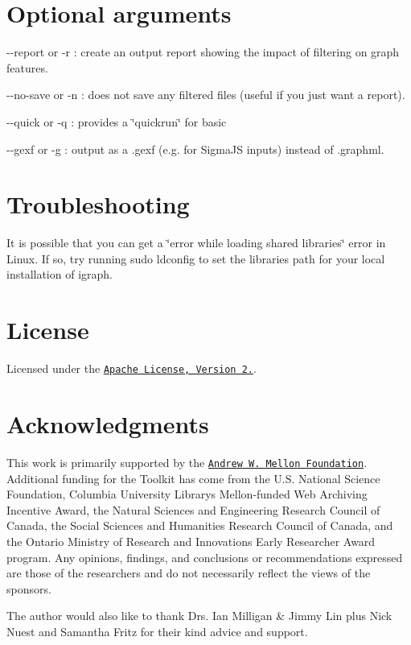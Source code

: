 \section*{Optional arguments}


\begin{DoxyItemize}
\item {\ttfamily -\/-\/report} or {\ttfamily -\/r} \+: create an output report showing the impact of filtering on graph features.
\item {\ttfamily -\/-\/no-\/save} or {\ttfamily -\/n} \+: does not save any filtered files (useful if you just want a report).
\item {\ttfamily -\/-\/quick} or {\ttfamily -\/q} \+: provides a \char`\"{}quickrun\char`\"{} for basic
\item {\ttfamily -\/-\/gexf} or {\ttfamily -\/g} \+: output as a .gexf (e.\+g. for Sigma\+JS inputs) instead of .graphml.
\end{DoxyItemize}

\section*{Troubleshooting}

It is possible that you can get a \char`\"{}error while loading shared libraries\char`\"{} error in Linux. If so, try running {\ttfamily sudo ldconfig} to set the libraries path for your local installation of igraph.

\section*{License}

Licensed under the \href{http://www.apache.org/licenses/LICENSE-2.0}{\tt Apache License, Version 2.}.

\section*{Acknowledgments}

This work is primarily supported by the \href{https://uwaterloo.ca/arts/news/multidisciplinary-project-will-help-historians-unlock}{\tt Andrew W. Mellon Foundation}. Additional funding for the Toolkit has come from the U.\+S. National Science Foundation, Columbia University Library\textquotesingle{}s Mellon-\/funded Web Archiving Incentive Award, the Natural Sciences and Engineering Research Council of Canada, the Social Sciences and Humanities Research Council of Canada, and the Ontario Ministry of Research and Innovation\textquotesingle{}s Early Researcher Award program. Any opinions, findings, and conclusions or recommendations expressed are those of the researchers and do not necessarily reflect the views of the sponsors.

The author would also like to thank Drs. Ian Milligan \& Jimmy Lin plus Nick Nuest and Samantha Fritz for their kind advice and support. 